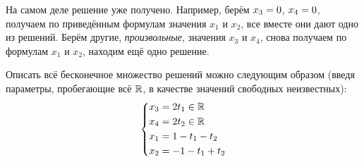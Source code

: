 \documentclass[a4paper,12pt]{article}
\begin{document}
  На самом деле решение уже получено.
  Например, берём $x_3 \hm= 0$, $x_4 \hm= 0$, получаем по приведённым формулам значения $x_1$ и $x_2$, все вместе они дают одно из решений.
  Берём другие, \emph{произвольные}, значения $x_3$ и $x_4$, снова получаем по формулам $x_1$ и $x_2$, находим ещё одно решение.

  Описать всё бесконечное множество решений можно следующим образом (введя параметры, пробегающие всё $\operatorname{\mathbb R}$, в качестве значений свободных неизвестных):
  \[
    \left\{
      \begin{aligned}
        &x_3 = 2 t_1 \in \operatorname{\mathbb R}\\
        &x_4 = 2 t_2 \in \operatorname{\mathbb R}\\
        &x_1 = 1 - t_1 - t_2\\
        &x_2 = -1 - t_1 + t_2
      \end{aligned}
    \right.
  \]
\end{document}
